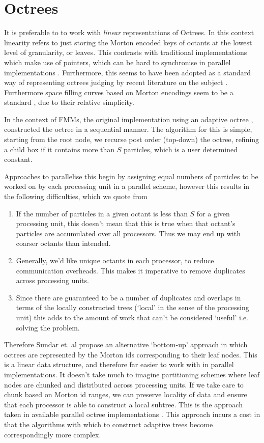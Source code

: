 \documentclass[12pt, a4, twoside]{article}
\begin{document}
\section*{Octrees}

It is preferable to to work with \textit{linear} representations of Octrees. In this context linearity refers to just storing the Morton encoded keys of octants at the lowest level of granularity, or leaves. This contrasts with traditional implementations which make use of pointers, which can be hard to synchronise in parallel implementations \cite{Sundar:2008:SIAM}. Furthermore, this seems to have been adopted as a standard way of representing octrees judging by recent literature on the subject \cite{Malhotra,Lashuk:2012:ACM}. Furthermore space filling curves based on Morton encodings seem to be a standard \cite{Malhotra,Sundar:2008:SIAM}, due to their relative simplicity.

In the context of FMMs, the original implementation using an adaptive octree \cite{Carrier1988}, constructed the octree in a sequential manner. The algorithm for this is simple, starting from the root node, we recurse post order (top-down) the octree, refining a child box if it contains more than $S$ particles, which is a user determined constant.

Approaches to parallelise this begin by assigning equal numbers of particles to be worked on by each processing unit in a parallel scheme, however this results in the following difficulties, which we quote from \cite{Sundar:2008:SIAM}

\begin{enumerate}
    \item If the number of particles in a given octant is less than $S$ for a given processing unit, this doesn't mean that this is true when that octant's particles are accumulated over all processors. Thus we may end up with coarser octants than intended.
    \item Generally, we'd like unique octants in each processor, to reduce communication overheads. This makes it imperative to remove duplicates across processing units.
    \item Since there are guaranteed to be a number of duplicates and overlaps in terms of the locally constructed trees (`local' in the sense of the processing unit) this adds to the amount of work that can't be considered `useful' i.e. solving the problem.
\end{enumerate}

Therefore Sundar et. al propose an alternative `bottom-up' approach in which octrees are represented by the Morton ids corresponding to their leaf nodes. This is a linear data structure, and therefore far easier to work with in parallel implementations. It doesn't take much to imagine partitioning schemes where leaf nodes are chunked and distributed across processing units. If we take care to chunk based on Morton id ranges, we can preserve locality of data and ensure that each processor is able to construct a local subtree. This is the approach taken in available parallel octree implementations \cite{Lashuk:2012:ACM, Malhotra}. This approach incurs a cost in that the algorithms with which to construct adaptive trees become correspondingly more complex.
\end{document}
